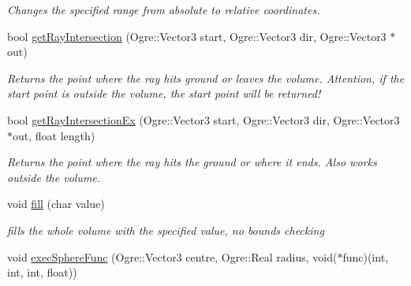 \begin{DoxyCompactItemize}
\begin{DoxyCompactList}\small\item\em \-Changes the specified range from absolute to relative coordinates. \end{DoxyCompactList}\item 
\hypertarget{classVoxelVolume_adbcbce0130567e273366e319cbf7d8ef}{
bool \hyperlink{classVoxelVolume_adbcbce0130567e273366e319cbf7d8ef}{get\-Ray\-Intersection} (\-Ogre\-::\-Vector3 start, \-Ogre\-::\-Vector3 dir, \-Ogre\-::\-Vector3 $\ast$out)}
\label{d0/d1c/classVoxelVolume_adbcbce0130567e273366e319cbf7d8ef}

\begin{DoxyCompactList}\small\item\em \-Returns the point where the ray hits ground or leaves the volume. \-Attention, if the start point is outside the volume, the start point will be returned! \end{DoxyCompactList}\item 
\hypertarget{classVoxelVolume_a694380cdfb7334c29c86ce8f2038d912}{
bool \hyperlink{classVoxelVolume_a694380cdfb7334c29c86ce8f2038d912}{get\-Ray\-Intersection\-Ex} (\-Ogre\-::\-Vector3 start, \-Ogre\-::\-Vector3 dir, \-Ogre\-::\-Vector3 $\ast$out, float length)}
\label{d0/d1c/classVoxelVolume_a694380cdfb7334c29c86ce8f2038d912}

\begin{DoxyCompactList}\small\item\em \-Returns the point where the ray hits the ground or where it ends. \-Also works outside the volume. \end{DoxyCompactList}\item 
\hypertarget{classVoxelVolume_a47242d8b5362f17f1f025804e0253d7e}{
void \hyperlink{classVoxelVolume_a47242d8b5362f17f1f025804e0253d7e}{fill} (char value)}
\label{d0/d1c/classVoxelVolume_a47242d8b5362f17f1f025804e0253d7e}

\begin{DoxyCompactList}\small\item\em fills the whole volume with the specified value, no bounds checking \end{DoxyCompactList}\item 
\hypertarget{classVoxelVolume_a239f1f381562b5309af764235ab7524e}{
void \hyperlink{classVoxelVolume_a239f1f381562b5309af764235ab7524e}{exec\-Sphere\-Func} (\-Ogre\-::\-Vector3 centre, \-Ogre\-::\-Real radius, void($\ast$func)(int, int, int, float))}
\label{d0/d1c/classVoxelVolume_a239f1f381562b5309af764235ab7524e}


\end{DoxyCompactItemize}
